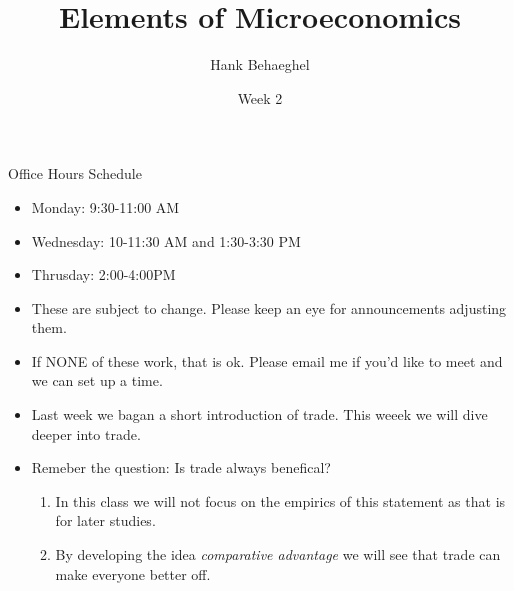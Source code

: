 \documentclass{beamer}
\title{Elements of Microeconomics}
\author{Hank Behaeghel}
\date{Week 2}
\begin{document}
\maketitle

\begin{frame}{Office Hours Schedule}
    \begin{itemize}
        \item Monday: 9:30-11:00 AM
        \item Wednesday: 10-11:30 AM and 1:30-3:30 PM
        \item Thrusday: 2:00-4:00PM
        \vspace{5mm}
        \item These are subject to change. Please keep an eye for announcements adjusting them.
        \item If NONE of these work, that is ok. Please email me if you'd like to meet and we can set up a time.
    \end{itemize}
\end{frame}
\begin{frame}
    \begin{itemize}
        \item Last week we bagan a short introduction of trade. This weeek we will dive deeper into trade.
        \vspace*{5mm}
        \item Remeber the question: Is trade always benefical?
        \begin{enumerate}
            \item In this class we will not focus on the empirics of this statement as that is for later studies.
            \item By developing the idea \textit{comparative advantage} we will see that trade can make everyone better off.
        \end{enumerate}
    \end{itemize}
\end{frame}
\end{document}
